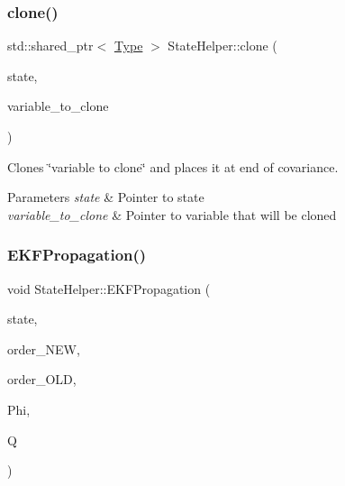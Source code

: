 \subsubsection{\texorpdfstring{clone()}{clone()}}
{\footnotesize\ttfamily std\+::shared\+\_\+ptr$<$ \hyperlink{classov__type_1_1Type}{Type} $>$ State\+Helper\+::clone (\begin{DoxyParamCaption}\item[{std\+::shared\+\_\+ptr$<$ \hyperlink{classov__msckf_1_1State}{State} $>$}]{state,  }\item[{std\+::shared\+\_\+ptr$<$ \hyperlink{classov__type_1_1Type}{ov\+\_\+type\+::\+Type} $>$}]{variable\+\_\+to\+\_\+clone }\end{DoxyParamCaption})\hspace{0.3cm}{\ttfamily [static]}}



Clones \char`\"{}variable to clone\char`\"{} and places it at end of covariance. 


\begin{DoxyParams}{Parameters}
{\em state} & Pointer to state \\
\hline
{\em variable\+\_\+to\+\_\+clone} & Pointer to variable that will be cloned \\
\hline
\end{DoxyParams}
\mbox{\label{classov__msckf_1_1StateHelper_a31f92fdf5bac87bfc23d34334af7bd4d}} 
\subsubsection{\texorpdfstring{E\+K\+F\+Propagation()}{EKFPropagation()}}
{\footnotesize\ttfamily void State\+Helper\+::\+E\+K\+F\+Propagation (\begin{DoxyParamCaption}\item[{std\+::shared\+\_\+ptr$<$ \hyperlink{classov__msckf_1_1State}{State} $>$}]{state,  }\item[{const std\+::vector$<$ std\+::shared\+\_\+ptr$<$ \hyperlink{classov__type_1_1Type}{ov\+\_\+type\+::\+Type} $>$$>$ \&}]{order\+\_\+\+N\+EW,  }\item[{const std\+::vector$<$ std\+::shared\+\_\+ptr$<$ \hyperlink{classov__type_1_1Type}{ov\+\_\+type\+::\+Type} $>$$>$ \&}]{order\+\_\+\+O\+LD,  }\item[{const Eigen\+::\+Matrix\+Xd \&}]{Phi,  }\item[{const Eigen\+::\+Matrix\+Xd \&}]{Q }\end{DoxyParamCaption})\hspace{0.3cm}{\ttfamily [static]}}



